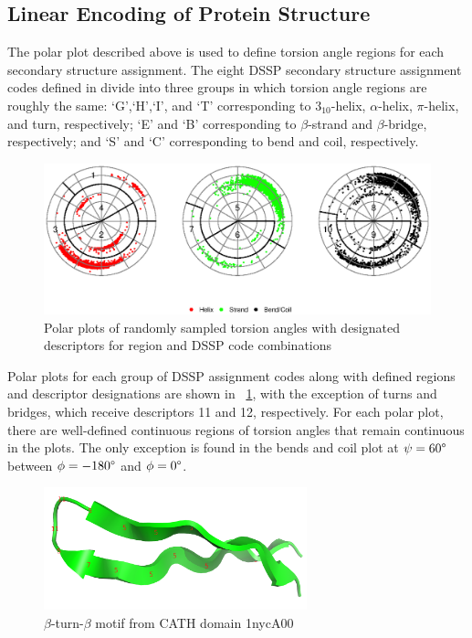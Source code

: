 \documentclass[a4,center,fleqn]{NAR}
\begin{document}
\subsection{Linear Encoding of Protein Structure}

The polar plot described above is used to define torsion angle regions for each secondary structure assignment. 
The eight DSSP secondary structure assignment codes defined in \cite{Kabsch1983} divide into three groups in which torsion angle regions are roughly the same: `G',`H',`I', and `T' corresponding to $3_{10}$-helix, $\alpha$-helix, $\pi$-helix, and turn, respectively; `E' and `B' corresponding to $\beta$-strand and $\beta$-bridge, respectively; and `S' and `C' corresponding to bend and coil, respectively.

\begin{figure}[tb]
\begin{center}
\includegraphics{regions}
\end{center}
\caption{Polar plots of randomly sampled torsion angles with designated descriptors for region and DSSP code combinations}
\label{fig:regions}
\end{figure}

Polar plots for each group of DSSP assignment codes along with defined regions and descriptor designations are shown in \figurename~\ref{fig:regions}, with the exception of turns and bridges, which receive descriptors 11 and 12, respectively. 
For each polar plot, there are well-defined continuous regions of torsion angles that remain continuous in the plots. 
The only exception is found in the bends and coil plot at $\psi = 60\degree$ between $\phi = -180\degree$ and $\phi = 0\degree$.

\begin{figure}[tb]
\begin{center}
\includegraphics[width=3in,keepaspectratio]{1nycA00}
\end{center}
\caption{$\beta$-turn-$\beta$ motif from CATH domain 1nycA00}
\label{fig:beta_turn}
\end{figure}
\end{document}
